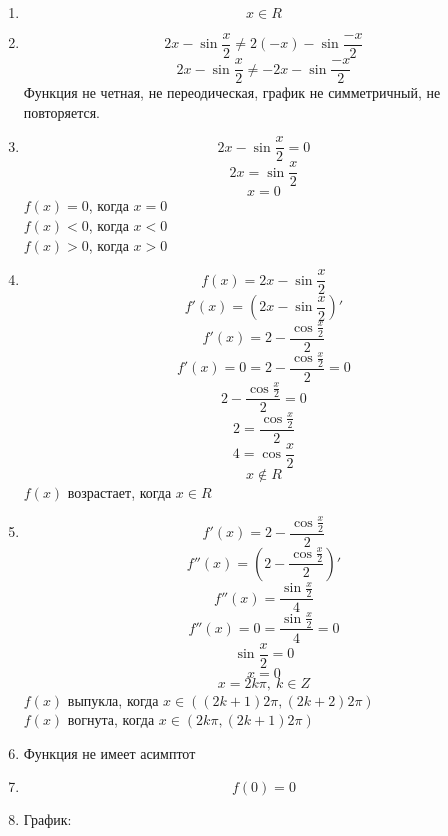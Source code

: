 \documentclass{article}
\begin{document}
\begin{enumerate}
  \item $$ x \in R $$
  \item $$ 2x - \sin \frac{x}{2} \neq 2(-x) - \sin \frac{-x}{2}$$
        $$  2x - \sin \frac{x}{2} \neq -2x - \sin \frac{-x}{2}$$
        Функция не четная, не переодическая, график не симметричный, не повторяется.
  \item $$ 2x - \sin \frac{x}{2} = 0$$
        $$  2x = \sin \frac{x}{2} $$
        $$  x = 0 $$
        $ f(x) = 0 $, когда $x = 0$ \\
        $ f(x) < 0 $, когда $x < 0$ \\
        $ f(x) > 0 $, когда $x > 0$
  \item $$ f(x) =   2x - \sin \frac{x}{2} $$
        $$ f'(x) =  \left( 2x - \sin \frac{x}{2}\right)' $$
        $$ f'(x) =  2 - \frac{\cos{\frac{x}{2}}}{2} $$
        $$ f'(x) = 0 =  2 - \frac{\cos{\frac{x}{2}}}{2} = 0 $$
        $$ 2 - \frac{\cos{\frac{x}{2}}}{2} = 0 $$
        $$ 2 = \frac{\cos{\frac{x}{2}}}{2} $$
        $$ 4 = \cos{\frac{x}{2}} $$
        $$ x \notin R $$
        $ f(x) $ возрастает, когда $x \in R $ \\
  \item $$ f'(x) =  2 - \frac{\cos{\frac{x}{2}}}{2} $$
        $$ f''(x) =  \left( 2 - \frac{\cos{\frac{x}{2}}}{2}\right)' $$
        $$ f''(x) =  \frac{\sin{\frac{x}{2}}}{4} $$
        $$ f''(x) = 0 = \frac{\sin{\frac{x}{2}}}{4} = 0 $$
        $$  \sin{\frac{x}{2}} = 0 $$
        $$ x = 0 $$
        $$ x = 2k\pi,\ k\in Z$$
        $ f(x) $ выпукла, когда  $x \in ((2k + 1)2\pi, (2k + 2)2\pi)$ \\
        $ f(x) $ вогнута, когда $x \in (2k\pi, (2k + 1)2\pi)$
  \item Функция не имеет асимптот
  \item $$ f(0) = 0 $$
  \item График:

\end{enumerate}
\end{document}
